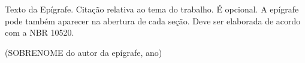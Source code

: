 \begin{epigrafe}
\vspace*{\fill}
\hspace{.45\textwidth}
\begin{minipage}{.5\textwidth}
\itshape
	
	Texto da Epígrafe. Citação relativa ao tema do trabalho. É opcional. A epígrafe pode também aparecer na abertura de cada seção. Deve ser elaborada de acordo com a NBR 10520. \\

	\begin{flushright}		
	(SOBRENOME do autor da epígrafe, ano) 
	\end{flushright}
\end{minipage}
\end{epigrafe}
